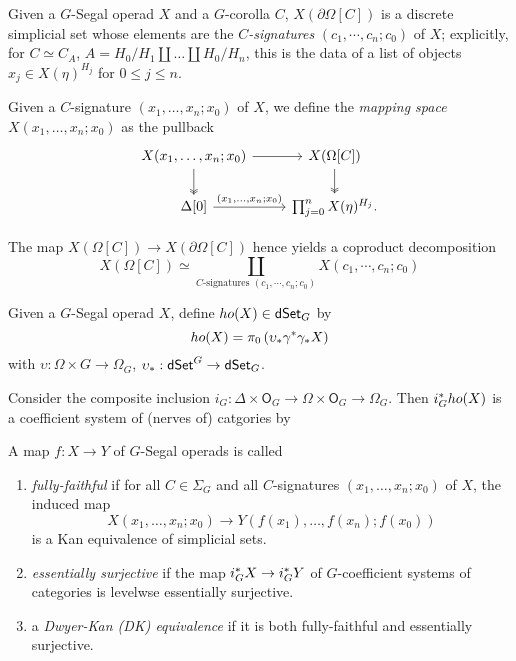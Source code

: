 \documentclass[a4paper,10pt
,draft
]{article}%
\renewcommand{\1}{\eta}%
\begin{document}
\begin{definition}%
      Given a $G$-Segal operad $X$ and a $G$-corolla $C$,
      $X(\partial \Omega[C])$ is a discrete simplicial set whose elements
      are the \textit{$C$-signatures} $(c_1,\cdots,c_n;c_0)$ of $X$;
      explicitly, for $C \simeq C_A$, $A = H_0/H_1 \amalg \dots \amalg H_0/H_n$, this is the data of
      a list of objects $x_j \in X(\eta)^{H_j}$ for $0 \leq j \leq n$.

      Given a $C$-signature $(x_1, \dots, x_n; x_0)$ of $X$, we define the \textit{mapping space} $X(x_1,\dots,x_n; x_0)$ as the pullback
      \[
            \begin{tikzcd}
                  X(x_1, \dots, x_n; x_0) \arrow[r] \arrow[d, twoheadrightarrow]
                  &
                  X(\Omega[C]) \arrow[d, twoheadrightarrow]
                  \\
                  \Delta[0] \arrow[r, "{(x_1, \dots, x_n;x_0)}"]
                  &
                  \prod_{j = 0}^n X(\eta)^{H_j}.
            \end{tikzcd}
      \]

      The map $X(\Omega[C]) \to X(\partial \Omega[C])$ hence yields
      a coproduct decomposition 
      \[
            X(\Omega[C]) \simeq \coprod_{C\text{-signatures }(c_1,\cdots,c_n;c_0)}
            X(c_1,\cdots,c_n;c_0)
      \]    
\end{definition}

\begin{definition}
      Given a $G$-Segal operad $X$, define $ho(X) \in \mathsf{dSet}_G$ by
      \[
            ho(X) = \pi_0\left(\upsilon_{\**}\gamma^{\**}\gamma_{\**}X\right)
      \]
      with $\upsilon: \Omega \times G \to \Omega_G$, $\upsilon_{\**}: \dSet^G \to \dSet_G$.

      Consider the composite inclusion $i_G: \Delta \times \mathsf O_G \to \Omega \times \mathsf O_G \to \Omega_G$.
      Then $i_G^{\**}ho(X)$ is a coefficient system of (nerves of) catgories by \cite[Prop. 5.9, Remark 5.11]{BP_edss}
\end{definition}

\begin{definition}
      A map $f \colon X \to Y$ of $G$-Segal operads is called
      \begin{enumerate}[label = (\roman*)]
      \item \textit{fully-faithful} if for all $C \in \Sigma_G$ and all $C$-signatures $(x_1,\dots, x_n;x_0)$ of $X$, the induced map
            \[
                  X(x_1, \dots, x_n; x_0) \to Y(f(x_1), \dots, f(x_n); f(x_0))
            \]
            is a Kan equivalence of simplicial sets.
      \item \textit{essentially surjective} if the map $i_G^{\**}X \to i_G^{\**}Y$ of $G$-coefficient systems of categories
            is levelwse essentially surjective.
      \item a \textit{Dwyer-Kan (DK) equivalence} if it is both fully-faithful and essentially surjective.
      \end{enumerate}
\end{definition}
\end{document}
